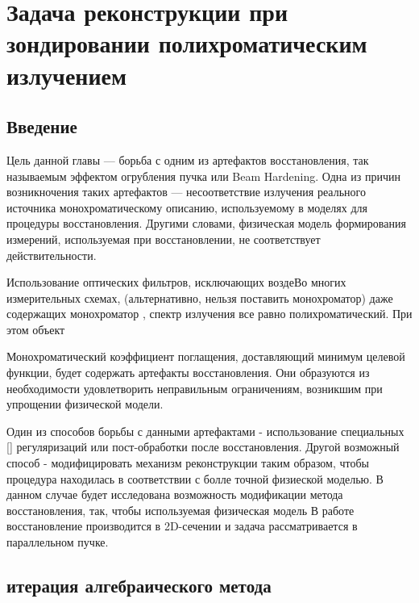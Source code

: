 \chapter{Задача реконструкции при зондировании полихроматическим излучением} \label{chapt3}
\section{Введение}

Цель данной главы --- борьба с одним из артефактов восстановления, так называемым эффектом огрубления пучка или Beam Hardening. 
Одна из причин возникночения таких артефактов --- несоответствие излучения реального источника монохроматическому описанию, используемому в моделях для процедуры восстановления.
Другими словами, физическая модель формирования измерений, используемая при восстановлении, не соответствует действительности.

Использование оптических фильтров, исключающих воздеВо многих измерительных схемах, (альтернативно, нельзя поставить монохроматор) даже содержащих монохроматор \cite{chukalina2014xray}, спектр излучения все равно полихроматический. 
При этом объект

Монохроматический коэффициент поглащения, доставляющий минимум целевой функции, будет содержать артефакты восстановления.
Они образуются из необходимости удовлетворить неправильным ограничениям, возникшим при упрощении физической модели.

Один из способов борьбы с данными артефактами - использование специальных [] регуляризаций или пост-обработки после восстановления.
Другой возможный способ - модифицировать механизм реконструкции таким образом, чтобы процедура находилась в соответствии с болле точной физиеской моделью.
В данном случае будет исследована возможность модификации метода восстановления, так, чтобы используемая физическая модель 
В работе восстановление производится в 2D-сечении и задача рассматривается в параллельном пучке.

\section{итерация алгебраического метода} \label{sect3_1}

